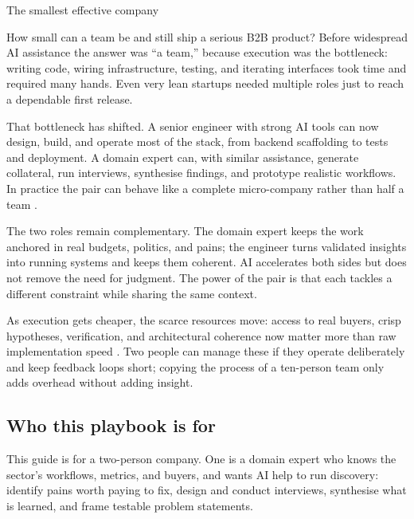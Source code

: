 \documentclass[10pt, a4paper, twocolumn]{article} %
\makeatletter
\let\orig@section\section %
\renewcommand{\section}{%
  \@ifstar{\orig@section*}{\unnumberedsteppingsection}%
}
\newcommand{\unnumberedsteppingsection}[1]{%
  \refstepcounter{section}%
  \orig@section*{#1}%
}
\makeatother
\begin{document}
\clearpage
\color{Black}
\hypersetup{citecolor=black} %



\section{The smallest effective company}

How small can a team be and still ship a serious B2B product? Before widespread AI assistance the answer was “a team,” because execution was the bottleneck: writing code, wiring infrastructure, testing, and iterating interfaces took time and required many hands. Even very lean startups needed multiple roles just to reach a dependable first release.

That bottleneck has shifted. A senior engineer with strong AI tools can now design, build, and operate most of the stack, from backend scaffolding to tests and deployment. A domain expert can, with similar assistance, generate collateral, run interviews, synthesise findings, and prototype realistic workflows. In practice the pair can behave like a complete micro-company rather than half a team \citep{forsgren2018accelerate,blomgren2025coordination}.

The two roles remain complementary. The domain expert keeps the work anchored in real budgets, politics, and pains; the engineer turns validated insights into running systems and keeps them coherent. AI accelerates both sides but does not remove the need for judgment. The power of the pair is that each tackles a different constraint while sharing the same context.

As execution gets cheaper, the scarce resources move: access to real buyers, crisp hypotheses, verification, and architectural coherence now matter more than raw implementation speed \citep{ries2011lean,bland2019testing,blomgren2025coordination}. Two people can manage these if they operate deliberately and keep feedback loops short; copying the process of a ten-person team only adds overhead without adding insight.

\subsection{Who this playbook is for}

This guide is for a two-person company. One is a domain expert who knows the sector’s workflows, metrics, and buyers, and wants AI help to run discovery: identify pains worth paying to fix, design and conduct interviews, synthesise what is learned, and frame testable problem statements.
\end{document}
